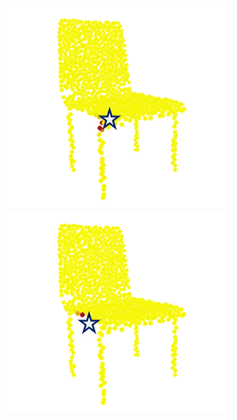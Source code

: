 \documentclass[letterpaper]{article} %
\begin{document}
\begin{figure}[htbp]
\begin{center}
\begin{minipage}[b]{0.8\linewidth}
\begin{center}
\begin{minipage}[b]{0.12\linewidth}
\begin{center}
\end{center}
\end{minipage}
\begin{minipage}[b]{0.12\linewidth}
\begin{center}
\includegraphics[width=1.0\linewidth]{images/atten_pic/dgcnn_chair_feature_1.png}
\end{center}
\end{minipage}
\begin{minipage}[b]{0.12\linewidth}
\begin{center}
\includegraphics[width=1.0\linewidth]{images/atten_pic/dgcnn_chair_feature_2.png}

\end{center}
\end{minipage}
\end{center}
\end{minipage}
\end{center}
\end{figure}
\end{document}
